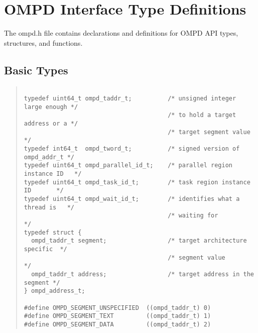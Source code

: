 \section{OMPD Interface Type Definitions}
\label{appendix:ompd-types}

The ompd.h file contains declarations and definitions for OMPD API
types, structures, and functions.

\subsection{Basic Types}

\begin{quote}
\begin{lstlisting}

typedef uint64_t ompd_taddr_t;          /* unsigned integer large enough */
                                        /* to hold a target address or a */
                                        /* target segment value          */
typedef int64_t  ompd_tword_t;          /* signed version of ompd_addr_t */
typedef uint64_t ompd_parallel_id_t;    /* parallel region instance ID   */
typedef uint64_t ompd_task_id_t;        /* task region instance ID       */
typedef uint64_t ompd_wait_id_t;        /* identifies what a thread is   */
                                        /* waiting for                   */
typedef struct {
  ompd_taddr_t segment;                 /* target architecture specific  */
                                        /* segment value                 */
  ompd_taddr_t address;                 /* target address in the segment */
} ompd_address_t;

#define OMPD_SEGMENT_UNSPECIFIED  ((ompd_taddr_t) 0)
#define OMPD_SEGMENT_TEXT         ((ompd_taddr_t) 1)
#define OMPD_SEGMENT_DATA         ((ompd_taddr_t) 2)

\end{lstlisting}
\end{quote}

